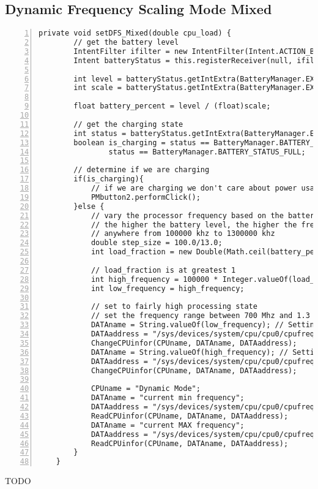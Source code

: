 \documentclass{article}	%
\begin{document}
\subsection{Dynamic Frequency Scaling Mode Mixed}
\begin{lstlisting}[float=*,caption={Dynamic Frequency Scaling Mode Mixed},label={lst:DFS_mixed},numbers=left]
private void setDFS_Mixed(double cpu_load) {
		// get the battery level
		IntentFilter ifilter = new IntentFilter(Intent.ACTION_BATTERY_CHANGED);
		Intent batteryStatus = this.registerReceiver(null, ifilter);

		int level = batteryStatus.getIntExtra(BatteryManager.EXTRA_LEVEL, -1);
		int scale = batteryStatus.getIntExtra(BatteryManager.EXTRA_SCALE, -1);

		float battery_percent = level / (float)scale;

		// get the charging state
		int status = batteryStatus.getIntExtra(BatteryManager.EXTRA_STATUS, -1);
		boolean is_charging = status == BatteryManager.BATTERY_STATUS_CHARGING ||
				status == BatteryManager.BATTERY_STATUS_FULL;

		// determine if we are charging
		if(is_charging){
			// if we are charging we don't care about power usage.... set to high performance mode
			PMbutton2.performClick();
		}else {
			// vary the processor frequency based on the battery level.
			// the higher the battery level, the higher the frequency.
			// anywhere from 100000 khz to 1300000 khz
			double step_size = 100.0/13.0;
			int load_fraction = new Double(Math.ceil(battery_percent / step_size)).intValue();

			// load_fraction is at greatest 1
			int high_frequency = 100000 * Integer.valueOf(load_fraction * 13);
			int low_frequency = high_frequency;

			// set to fairly high processing state
			// set the frequency range between 700 Mhz and 1.3 Ghz
			DATAname = String.valueOf(low_frequency); // Setting up the minimum frequency at low frequency
			DATAaddress = "/sys/devices/system/cpu/cpu0/cpufreq/scaling_min_freq";
			ChangeCPUinfor(CPUname, DATAname, DATAaddress);
			DATAname = String.valueOf(high_frequency); // Setting up the maximum frequency at high frequency
			DATAaddress = "/sys/devices/system/cpu/cpu0/cpufreq/scaling_max_freq";
			ChangeCPUinfor(CPUname, DATAname, DATAaddress);

			CPUname = "Dynamic Mode";
			DATAname = "current min frequency";
			DATAaddress = "/sys/devices/system/cpu/cpu0/cpufreq/scaling_min_freq";
			ReadCPUinfor(CPUname, DATAname, DATAaddress);
			DATAname = "current MAX frequency";
			DATAaddress = "/sys/devices/system/cpu/cpu0/cpufreq/scaling_max_freq";
			ReadCPUinfor(CPUname, DATAname, DATAaddress);
		}
	}
\end{lstlisting}
TODO
\end{document}
